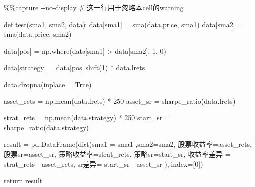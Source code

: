 \documentclass[
  letterpaper,
  DIV=11,
  numbers=noendperiod]{scrreprt}
\newenvironment{Shaded}{\begin{snugshade}}{\end{snugshade}}
\newcommand{\BuiltInTok}[1]{\textcolor[rgb]{0.00,0.23,0.31}{#1}}
\newcommand{\CommentTok}[1]{\textcolor[rgb]{0.37,0.37,0.37}{#1}}
\newcommand{\ControlFlowTok}[1]{\textcolor[rgb]{0.00,0.23,0.31}{#1}}
\newcommand{\DecValTok}[1]{\textcolor[rgb]{0.68,0.00,0.00}{#1}}
\newcommand{\KeywordTok}[1]{\textcolor[rgb]{0.00,0.23,0.31}{#1}}
\newcommand{\NormalTok}[1]{\textcolor[rgb]{0.00,0.23,0.31}{#1}}
\newcommand{\OperatorTok}[1]{\textcolor[rgb]{0.37,0.37,0.37}{#1}}
\newcommand{\StringTok}[1]{\textcolor[rgb]{0.13,0.47,0.30}{#1}}
\newcommand{\VariableTok}[1]{\textcolor[rgb]{0.07,0.07,0.07}{#1}}
\begin{document}
\begin{Shaded}
\begin{Highlighting}[]
\OperatorTok{\%\%}\NormalTok{capture }\OperatorTok{{-}{-}}\NormalTok{no}\OperatorTok{{-}}\NormalTok{display }
\CommentTok{\# 这一行用于忽略本cell的warning}

\KeywordTok{def}\NormalTok{ test(sma1, sma2, data):}
\NormalTok{    data[}\StringTok{\textquotesingle{}sma1\textquotesingle{}}\NormalTok{] }\OperatorTok{=}\NormalTok{ sma(data.price, sma1)}
\NormalTok{    data[}\StringTok{\textquotesingle{}sma2\textquotesingle{}}\NormalTok{] }\OperatorTok{=}\NormalTok{ sma(data.price, sma2)}

\NormalTok{    data[}\StringTok{\textquotesingle{}pos\textquotesingle{}}\NormalTok{] }\OperatorTok{=}\NormalTok{ np.where(data[}\StringTok{\textquotesingle{}sma1\textquotesingle{}}\NormalTok{] }\OperatorTok{\textgreater{}}\NormalTok{ data[}\StringTok{\textquotesingle{}sma2\textquotesingle{}}\NormalTok{], }\DecValTok{1}\NormalTok{, }\DecValTok{0}\NormalTok{)}

\NormalTok{    data[}\StringTok{\textquotesingle{}strategy\textquotesingle{}}\NormalTok{] }\OperatorTok{=}\NormalTok{ data[}\StringTok{\textquotesingle{}pos\textquotesingle{}}\NormalTok{].shift(}\DecValTok{1}\NormalTok{) }\OperatorTok{*}\NormalTok{ data.lrets}

\NormalTok{    data.dropna(inplace }\OperatorTok{=} \VariableTok{True}\NormalTok{)}

\NormalTok{    asset\_rets }\OperatorTok{=}\NormalTok{ np.mean(data.lrets) }\OperatorTok{*} \DecValTok{250}
\NormalTok{    asset\_sr }\OperatorTok{=}\NormalTok{ sharpe\_ratio(data.lrets)}

\NormalTok{    strat\_rets }\OperatorTok{=}\NormalTok{ np.mean(data.strategy) }\OperatorTok{*} \DecValTok{250}
\NormalTok{    start\_sr }\OperatorTok{=}\NormalTok{ sharpe\_ratio(data.strategy)}

\NormalTok{    result }\OperatorTok{=}\NormalTok{ pd.DataFrame(}\BuiltInTok{dict}\NormalTok{(sma1 }\OperatorTok{=}\NormalTok{ sma1 ,sma2}\OperatorTok{=}\NormalTok{sma2, 股票收益率}\OperatorTok{=}\NormalTok{asset\_rets,}
\NormalTok{                            股票sr}\OperatorTok{=}\NormalTok{asset\_sr,}
\NormalTok{                            策略收益率}\OperatorTok{=}\NormalTok{strat\_rets,}
\NormalTok{                            策略sr}\OperatorTok{=}\NormalTok{start\_sr,}
\NormalTok{                            收益率差异 }\OperatorTok{=}\NormalTok{ strat\_rets }\OperatorTok{{-}}\NormalTok{ asset\_rets,}
\NormalTok{                            sr差异}\OperatorTok{=}\NormalTok{ start\_sr }\OperatorTok{{-}}\NormalTok{ asset\_sr}
\NormalTok{                            ), index}\OperatorTok{=}\NormalTok{[}\DecValTok{0}\NormalTok{])}

    \ControlFlowTok{return}\NormalTok{ result}
\end{Highlighting}
\end{Shaded}
\end{document}
